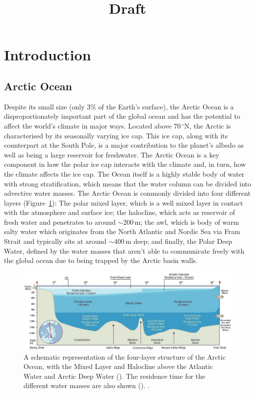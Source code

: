\documentclass[10pt,a4paper]{article}
\title{Draft}
\newcommand*\figref[1]{Figure~\ref{#1}}
\begin{document}
\maketitle


\section{Introduction}

\glsresetall

\subsection{Arctic Ocean}
\label{arcticocean}


Despite its small size (only $3\%$ of the Earth's surface), the Arctic
Ocean is a disproportionately important part of the global ocean and has the potential
to affect the world's climate in major ways. Located above
$70\,^{\circ}\mathrm{N}$, the Arctic is characterised by its seasonally
varying ice cap. This ice cap, along with its counterpart at the South
Pole, is a major contribution to the planet's albedo as well as being
a large reservoir for freshwater. The Arctic Ocean is a key component
in how the polar ice cap interacts with the climate and, in turn, how
the climate affects the ice cap. 
The Ocean itself is a highly stable body of water with strong stratification, 
which means that the water column can be divided into advective water masses.
The Arctic Ocean is commonly divided into four different layers (\figref{fig:amap}):
The polar mixed layer, which is a well mixed layer in
contact with the atmosphere and surface ice; the halocline, which acts as
reservoir of fresh water and penetrates to around ${\sim}200\,\mathrm{m}$; the \gls{awl},
which is body of warm salty water which originates from the North Atlantic and Nordic 
Sea via Fram Strait and typically sits at around ${\sim}400\,\mathrm{m}$ deep; and finally, 
the Polar Deep Water, defined by the water masses that aren't
able to communicate freely with the global ocean due to being trapped by the Arctic basin walls.



\begin{figure}
	\centering
	\includegraphics[width=\linewidth]{amap}
	\caption[\cite{wilson1998amap}]{  A schematic representation of the four-layer structure of the Arctic Ocean, with the Mixed Layer and Halocline
		above the Atlantic Water and Arctic Deep Water (\cite{aagaard1989role}). 
		The residence time for the different water masses are also shown (\cite{bonisch1995deep}). \cite{wilson1998amap}.}
	\label{fig:amap}
\end{figure}
\end{document}
